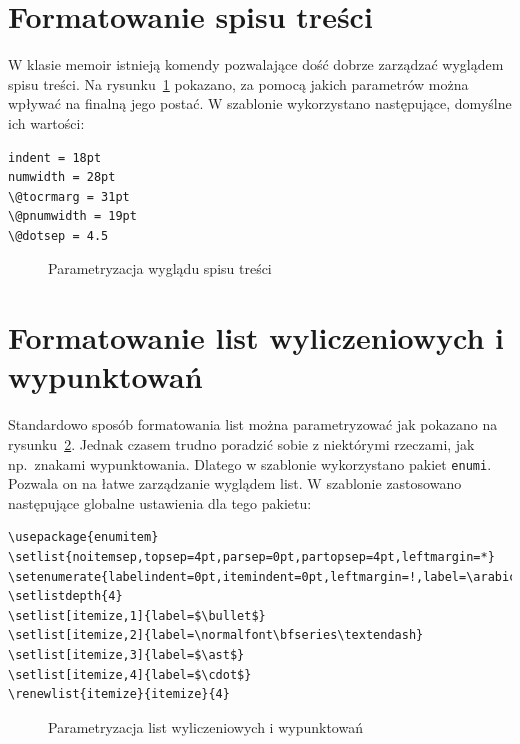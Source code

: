 
\section{Formatowanie spisu treści}
W klasie memoir istnieją komendy pozwalające dość dobrze zarządzać wyglądem spisu treści. Na rysunku~\ref{fig:ltoc} pokazano, za pomocą jakich parametrów można wpływać na finalną jego postać. W szablonie wykorzystano następujące, domyślne ich wartości:
\begin{lstlisting}[basicstyle=\footnotesize\ttfamily]
indent = 18pt
numwidth = 28pt
\@tocrmarg = 31pt
\@pnumwidth = 19pt
\@dotsep = 4.5
\end{lstlisting}

\begin{figure}[h]
	\drawtoc
	\caption{Parametryzacja wyglądu spisu treści} \label{fig:ltoc}
\end{figure}


\section{Formatowanie list wyliczeniowych i wypunktowań}
Standardowo sposób formatowania list można parametryzować jak pokazano na rysunku~\ref{fig:listlay}. Jednak czasem trudno poradzić sobie z niektórymi rzeczami, jak np.~znakami wypunktowania. Dlatego w szablonie wykorzystano pakiet \texttt{enumi}. Pozwala on na łatwe zarządzanie wyglądem list. W szablonie zastosowano następujące globalne ustawienia dla tego pakietu:
\begin{lstlisting}[basicstyle=\footnotesize\ttfamily]
\usepackage{enumitem}
\setlist{noitemsep,topsep=4pt,parsep=0pt,partopsep=4pt,leftmargin=*}
\setenumerate{labelindent=0pt,itemindent=0pt,leftmargin=!,label=\arabic*.}
\setlistdepth{4}
\setlist[itemize,1]{label=$\bullet$}
\setlist[itemize,2]{label=\normalfont\bfseries\textendash}
\setlist[itemize,3]{label=$\ast$}
\setlist[itemize,4]{label=$\cdot$}
\renewlist{itemize}{itemize}{4}
\end{lstlisting}
\begin{figure}[h]
	\centering
	\drawparameterstrue
	\drawlist
	\caption{Parametryzacja list wyliczeniowych i wypunktowań}\label{fig:listlay}
\end{figure}

